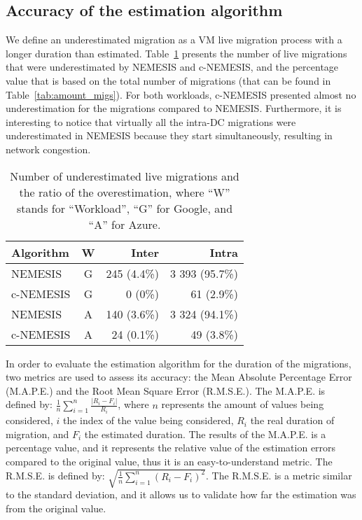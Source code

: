  \subsection{Accuracy of the estimation algorithm}
 
We define an underestimated migration as a VM live migration process with a longer duration than estimated. Table~\ref{tab:migs_under} presents the number of live migrations that were underestimated by NEMESIS and c-NEMESIS, and the percentage value that is based on the total number of migrations (that can be found in Table~\ref{tab:amount_migs}). For both workloads, c-NEMESIS presented almost no underestimation for the migrations compared to NEMESIS. Furthermore, it is interesting to notice that virtually all the intra-DC migrations were underestimated in NEMESIS because they start simultaneously, resulting in network congestion.

\begin{table}[!ht]
\caption{Number of underestimated live migrations and the ratio of the overestimation, where ``W'' stands for ``Workload'', ``G'' for Google, and ``A'' for Azure.}\label{tab:migs_under} \centering
\begin{tabular}{|l|c|r|r|}
  \hline
  \textbf{Algorithm} & \textbf{W}  & \textbf{Inter} & \textbf{Intra}   \\
  \hline
  NEMESIS  & G & 245 (4.4\%)   & 3 393 (95.7\%) \\
  \hline
  c-NEMESIS & G & 0 (0\%)  & 61 (2.9\%) \\
  \hline
  NEMESIS & A & 140 (3.6\%)   &  3 324 (94.1\%)   \\
  \hline
  c-NEMESIS & A & 24 (0.1\%)   & 49 (3.8\%) \\
  \hline  
\end{tabular}
\end{table}


In order to evaluate the estimation algorithm for the duration of the migrations, two metrics are used to assess its accuracy: the Mean Absolute Percentage Error (M.A.P.E.) and the Root Mean Square Error (R.M.S.E.). The M.A.P.E. is defined by: $ \frac{1}{n}\sum_{i=1}^{n}  \frac{| R_{i} - F_{i}|}{R_{i}}$, where $n$ represents the amount of values being considered, $i$ the index of the value being considered, $R_{i}$ the real duration of migration, and $F_{i}$ the estimated duration. The results of the M.A.P.E. is a percentage value, and it represents the relative value of the estimation errors compared to the original value, thus it is an easy-to-understand metric. The R.M.S.E. is defined by: $\sqrt{ \frac{1}{n}\sum_{i=1}^{n}  (R_{i} - F_{i})^2}$. The R.M.S.E. is a metric similar to the standard deviation, and it allows us to validate how far the estimation was from the original value.


